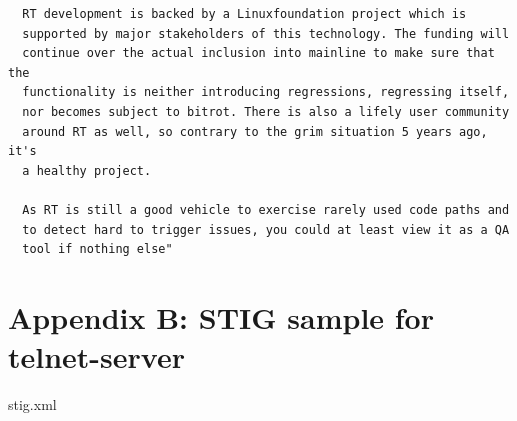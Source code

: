 \documentclass[12pt]{article}
\begin{document}
\begin{verbatim}
  RT development is backed by a Linuxfoundation project which is
  supported by major stakeholders of this technology. The funding will
  continue over the actual inclusion into mainline to make sure that the
  functionality is neither introducing regressions, regressing itself,
  nor becomes subject to bitrot. There is also a lifely user community
  around RT as well, so contrary to the grim situation 5 years ago, it's
  a healthy project.

  As RT is still a good vehicle to exercise rarely used code paths and
  to detect hard to trigger issues, you could at least view it as a QA
  tool if nothing else"
\end{verbatim}


%
\newpage
\section{Appendix B: STIG sample for telnet-server}

\lstset{
    language=xml,
    basicstyle=\footnotesize\ttfamily,
    linewidth=7.6in,
    frame=single,
    showstringspaces=false
}
\begin{adjustwidth}{-0.5in}{0.0in}
\begin{lstinputlisting}[caption={STIG XML sample},
label={lst:stig_xml}]{stig.xml}
\end{lstinputlisting}
\end{adjustwidth}
\vspace{0.8cm}


\end{document}
